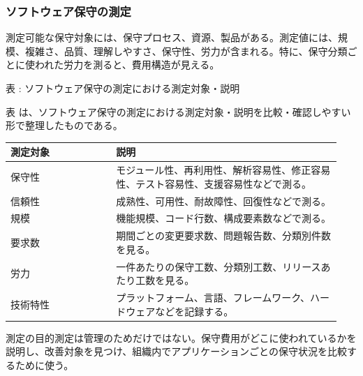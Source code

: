 \subsubsection{ソフトウェア保守の測定}
測定可能な保守対象には、保守プロセス、資源、製品がある。測定値には、規模、複雑さ、品質、理解しやすさ、保守性、労力が含まれる。特に、保守分類ごとに使われた労力を測ると、費用構造が見える。\par
\par\smallskip\noindent{}\label{tab:ch07-08}表 \thetable: ソフトウェア保守の測定における測定対象・説明\par\smallskip
表 \thetable は、ソフトウェア保守の測定における測定対象・説明を比較・確認しやすい形で整理したものである。\par\smallskip
\begin{longtable}{p{0.30\linewidth}p{0.64\linewidth}}
\toprule
測定対象 & 説明 \\
\midrule
\endhead
保守性 & モジュール性、再利用性、解析容易性、修正容易性、テスト容易性、支援容易性などで測る。 \\
信頼性 & 成熟性、可用性、耐故障性、回復性などで測る。 \\
規模 & 機能規模、コード行数、構成要素数などで測る。 \\
要求数 & 期間ごとの変更要求数、問題報告数、分類別件数を見る。 \\
労力 & 一件あたりの保守工数、分類別工数、リリースあたり工数を見る。 \\
技術特性 & プラットフォーム、言語、フレームワーク、ハードウェアなどを記録する。 \\
\bottomrule
\end{longtable}
\begin{pointbox}{測定の目的}測定は管理のためだけではない。保守費用がどこに使われているかを説明し、改善対象を見つけ、組織内でアプリケーションごとの保守状況を比較するために使う。\end{pointbox}
